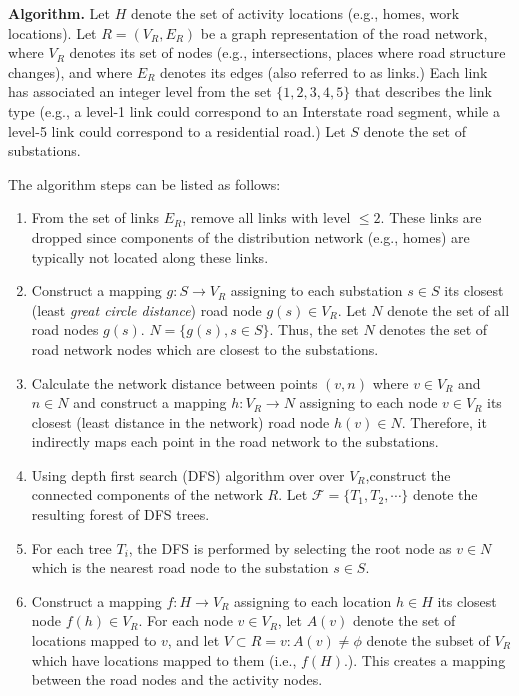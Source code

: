 \documentclass[12pt]{amsart}
\theoremstyle{definition}
\theoremstyle{remark} \newtheorem{remark}[theorem]{Remark} %
\numberwithin{equation}{section} %
\begin{document}
	\noindent
	\textbf{Algorithm.} Let $H$ denote the set of activity locations (e.g., homes, work locations). Let $R=(V_R,E_R)$ be a graph representation of the road network, where $V_R$ denotes its set of nodes (e.g., intersections, places where road structure changes), and where $E_R$ denotes its edges (also referred to as links.) Each link has associated an integer level from the set $\{1,2,3,4,5\}$ that describes the link type (e.g., a level-1 link could correspond to an Interstate road segment, while a level-5 link could correspond to a residential road.) Let $S$ denote the set of substations.
		
	The algorithm steps can be listed as follows:
	\begin{enumerate}
		\item From the set of links $E_R$, remove all links with level $\leq2$. These links are dropped since components of the distribution network (e.g., homes) are typically not located along these links.
		\item Construct a mapping $g:S\rightarrow V_R$ assigning to each substation $s\in S$ its closest (least \textit{great circle distance}) road node $g(s)\in V_R$. Let $N$ denote the set of all road nodes $g(s)$. $N=\{g(s),s\in S\}$. Thus, the set $N$ denotes the set of road network nodes which are closest to the substations.
		\item Calculate the network distance between points $(v,n)$ where $v\in V_R$ and $n\in N$ and construct a mapping $h:V_R\rightarrow N$ assigning to each node $v\in V_R$ its closest (least distance in the network) road node $h(v)\in N$. Therefore, it indirectly maps each point in the road network to the substations.
		\item Using depth first search (DFS) algorithm over over $V_R$,construct the connected components of the network $R$. Let $\mathcal{F}=\{T_1,T_2,\cdots\}$ denote the resulting forest of DFS trees.
		\item For each tree $T_i$, the DFS is performed by selecting the root node as $v\in N$ which is the nearest road node to the substation $s\in S$.
		\item Construct a mapping $f:H\rightarrow V_R$ assigning to each location $h \in H$ its closest node
		$f(h) \in V_R$. For each node $v \in V_R$, let $A(v)$ denote the set of locations mapped to $v$,
		and let $V\subset R = {v : A(v) \neq \phi}$ denote the subset of $V_R$ which have locations mapped to
		them (i.e., $f(H)$.). This creates a mapping between the road nodes and the activity nodes.
	\end{enumerate}
	
\end{document}
